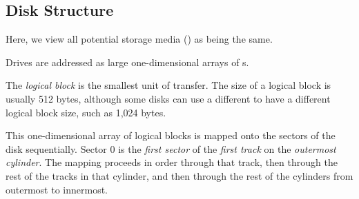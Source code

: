 \subsection{Disk Structure}\label{subsec:Disk_Structure}
Here, we view all potential storage media () as being the same.

Drives are addressed as large one-dimensional arrays of s.

\begin{definition}\label{def:Logical_Block}
  The \emph{logical block} is the smallest unit of transfer.
  The size of a logical block is usually 512 bytes, although some disks can use a different  to have a different logical block size, such as 1,024 bytes.
\end{definition}

This one-dimensional array of logical blocks is mapped onto the sectors of the disk sequentially.
Sector 0 is the \emph{first sector} of the \emph{first track} on the \emph{outermost cylinder}.
The mapping proceeds in order through that track, then through the rest of the tracks in that cylinder, and then through the rest of the cylinders from outermost to innermost.


